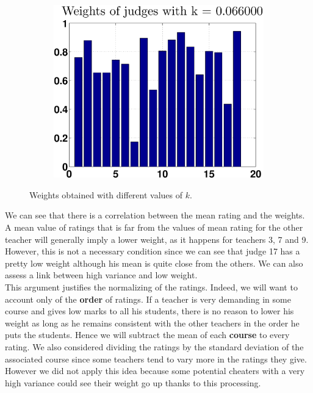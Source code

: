 \documentclass[12pt,a4paper]{article}
\begin{document}
\begin{figure}[h!]
\begin{subfigure}[b]{0.32\textwidth}
    \centering
    \includegraphics[width = \textwidth]{noPreprocess/weightsk660.eps}
\end{subfigure}
\caption{Weights obtained with different values of $k$. \label{noppk}}
\end{figure}

We can see that there is a correlation between the mean rating and the weights. A mean value of ratings that is far from the values of mean rating for the other teacher will generally imply a lower weight, as it happens for teachers 3, 7 and 9. However, this is not a necessary condition since we can see that judge 17 has a pretty low weight although his mean is quite close from the others. We can also assess a link between high variance and low weight.\\

This argument justifies the normalizing of the ratings. Indeed, we will want to account only of the \textbf{order} of ratings. If a teacher is very demanding in some course and gives low marks to all his students, there is no reason to lower his weight as long as he remains consistent with the other teachers in the order he puts the students. Hence we will subtract the mean of each \textbf{course} to every rating. We also considered dividing the ratings by the standard deviation of the associated course since some teachers tend to vary more in the ratings they give. However we did not apply this idea because some potential cheaters with a very high variance could see their weight go up thanks to this processing.
\FloatBarrier
\end{document}
